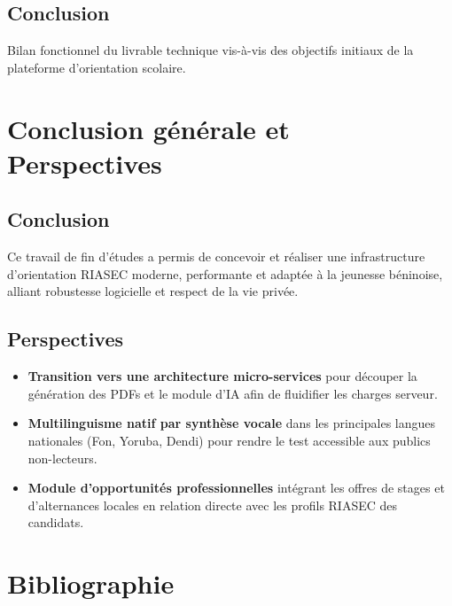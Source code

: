 \documentclass[12pt,a4paper]{report}
\begin{document}
\section{Conclusion}
Bilan fonctionnel du livrable technique vis-à-vis des objectifs initiaux de la plateforme d'orientation scolaire.

\chapter*{Conclusion générale et Perspectives}

\section*{Conclusion}
Ce travail de fin d'études a permis de concevoir et réaliser une infrastructure d'orientation RIASEC moderne, performante et adaptée à la jeunesse béninoise, alliant robustesse logicielle et respect de la vie privée.

\section*{Perspectives}
\begin{itemize}
    \item \textbf{Transition vers une architecture micro-services} pour découper la génération des PDFs et le module d'IA afin de fluidifier les charges serveur.
    \item \textbf{Multilinguisme natif par synthèse vocale} dans les principales langues nationales (Fon, Yoruba, Dendi) pour rendre le test accessible aux publics non-lecteurs.
    \item \textbf{Module d'opportunités professionnelles} intégrant les offres de stages et d'alternances locales en relation directe avec les profils RIASEC des candidats.
\end{itemize}

\chapter*{Bibliographie}
\end{document}
